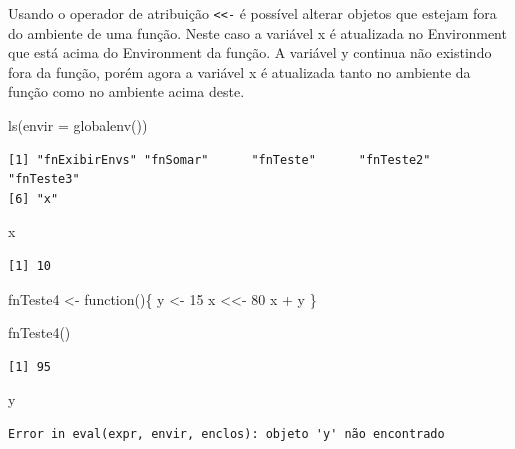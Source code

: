 \documentclass[
  letterpaper,
  DIV=11,
  numbers=noendperiod]{scrreprt}
\newenvironment{Shaded}{\begin{snugshade}}{\end{snugshade}}
\newcommand{\AttributeTok}[1]{\textcolor[rgb]{0.40,0.45,0.13}{#1}}
\newcommand{\ControlFlowTok}[1]{\textcolor[rgb]{0.00,0.23,0.31}{#1}}
\newcommand{\DecValTok}[1]{\textcolor[rgb]{0.68,0.00,0.00}{#1}}
\newcommand{\FunctionTok}[1]{\textcolor[rgb]{0.28,0.35,0.67}{#1}}
\newcommand{\NormalTok}[1]{\textcolor[rgb]{0.00,0.23,0.31}{#1}}
\newcommand{\OtherTok}[1]{\textcolor[rgb]{0.00,0.23,0.31}{#1}}
\newcommand{\SpecialCharTok}[1]{\textcolor[rgb]{0.37,0.37,0.37}{#1}}
\begin{document}
Usando o operador de atribuição \texttt{\textless{}\textless{}-} é
possível alterar objetos que estejam fora do ambiente de uma função.
Neste caso a variável x é atualizada no Environment que está acima do
Environment da função. A variável y continua não existindo fora da
função, porém agora a variável x é atualizada tanto no ambiente da
função como no ambiente acima deste.

\begin{Shaded}
\begin{Highlighting}[]
\FunctionTok{ls}\NormalTok{(}\AttributeTok{envir =} \FunctionTok{globalenv}\NormalTok{())}
\end{Highlighting}
\end{Shaded}

\begin{verbatim}
[1] "fnExibirEnvs" "fnSomar"      "fnTeste"      "fnTeste2"     "fnTeste3"    
[6] "x"           
\end{verbatim}

\begin{Shaded}
\begin{Highlighting}[]
\NormalTok{x}
\end{Highlighting}
\end{Shaded}

\begin{verbatim}
[1] 10
\end{verbatim}

\begin{Shaded}
\begin{Highlighting}[]
\NormalTok{fnTeste4 }\OtherTok{\textless{}{-}} \ControlFlowTok{function}\NormalTok{()\{}
\NormalTok{  y }\OtherTok{\textless{}{-}} \DecValTok{15}
\NormalTok{  x }\OtherTok{\textless{}\textless{}{-}} \DecValTok{80}
\NormalTok{  x }\SpecialCharTok{+}\NormalTok{ y}
\NormalTok{\}}

\FunctionTok{fnTeste4}\NormalTok{()}
\end{Highlighting}
\end{Shaded}

\begin{verbatim}
[1] 95
\end{verbatim}

\begin{Shaded}
\begin{Highlighting}[]
\NormalTok{y}
\end{Highlighting}
\end{Shaded}

\begin{verbatim}
Error in eval(expr, envir, enclos): objeto 'y' não encontrado
\end{verbatim}
\end{document}
